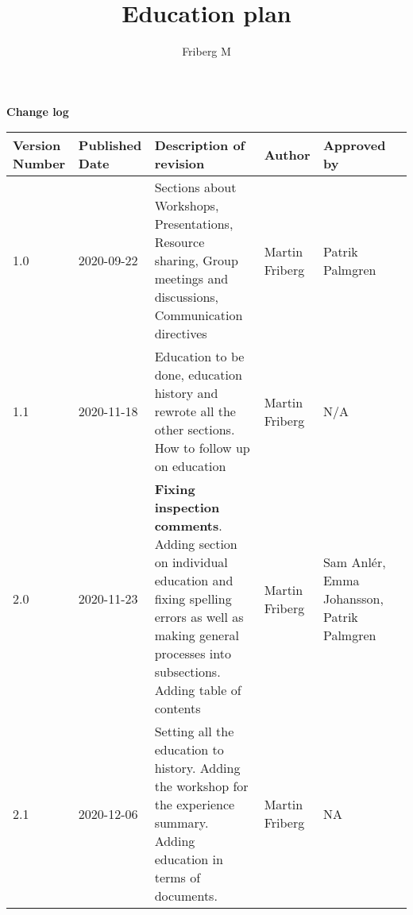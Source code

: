 \documentclass[12pt]{article}
\title{\Huge Education plan}
\author{Friberg M}
\begin{document}
    
    

    

    

    \begin{center}
    
    
 \textbf{\large Change log}

\vspace{10mm}

\begin{tabular}{ | m{5em} | m{5em}| m{10em} |m{5em}| m{5em} |m{5em} |  } 
\hline
Version Number& Published Date & Description of revision & Author & Approved by \\ 
\hline
1.0 & 2020-09-22 & Sections about Workshops, Presentations, Resource sharing, Group meetings and discussions, Communication directives & Martin Friberg & Patrik Palmgren \\
\hline
1.1 & 2020-11-18 & Education to be done, education history and rewrote all the other sections. How to follow up on education & Martin Friberg & N/A \\
\hline
2.0 & 2020-11-23 & \textbf{Fixing inspection comments}. Adding section on individual education and fixing spelling errors as well as making general processes into subsections. Adding table of contents & Martin Friberg & Sam Anlér, Emma Johansson, Patrik Palmgren \\
\hline
2.1 & 2020-12-06 & Setting all the education to history. Adding the workshop for the experience summary. Adding education in terms of documents. & Martin Friberg & NA \\
\hline

\end{tabular}
\end{center}
            
\newpage
     
    {
 
        \renewcommand{\contentsname}{Innehåll}
        \tableofcontents
    }
    
    
    \newpage
    




\end{document}
